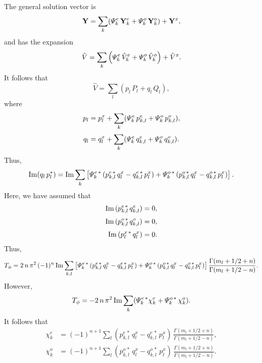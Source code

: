 \documentclass[12pt,prb,aps,notitlepage]{revtex4-1}
\begin{document}
The
general solution vector
is
\begin{equation}
{\bf Y} = \sum_k ({\mit\Psi}_k^e\,{\bf Y}_k^e + {\mit\Psi}_k^o\,{\bf Y}_k^o) + {\bf Y}^x,
\end{equation}
and has the expansion
\begin{equation}
\hat{V} = \sum_k\left({\mit\Psi}_k^e\,\hat{V}_k^e + {\mit\Psi}_k^o\,\hat{V}_k^o\right) + \hat{V}^x.
\end{equation}
It follows that
\begin{equation}
\hat{V} = \sum_l (p_l\,P_l+q_l\,Q_l),
\end{equation}
where 
\begin{align}
p_l &= p_l^x + \sum_k({\mit\Psi}_k^e\,p_{k,l}^e+ {\mit\Psi}_k^o\,p_{k,l}^o),\\[0.5ex]
q_l&= q_l^x + \sum_k({\mit\Psi}_k^e\,q_{k,l}^e+ {\mit\Psi}_k^o\,q_{k,l}^o).
\end{align}
Thus, 
\begin{equation}
{\rm Im}(q_l\,p_l^\ast)={\rm Im}\sum_k\left[{\mit\Psi}_k^{e\,\ast}\,(p_{k,l}^{e\,\ast}\,q_l^x - q_{k,l}^{e\,\ast}\,p_l^x) + {\mit\Psi}_k^{o\,\ast}\,(p_{k,l}^{o\,\ast}\,q_l^x-q_{k,l}^{o\,\ast}\,p_l^x)\right].
\end{equation}
Here, we have assumed that
\begin{align}
{\rm Im}\,(p_{k,l}^{e\,\ast}\,q_{k,l}^e)&=0,\\[0.5ex]
{\rm Im}\,( p_{k,l}^{o\,\ast}\,q_{k,l}^o)&=0,\\[0.5ex]
{\rm Im}\,(p_l^{x\,\ast}\,q_l^x)&=0.
\end{align}
Thus, 
\begin{equation}
T_\phi = 2\,n\,\pi^2\,(-1)^n\,{\rm Im}\sum_{k,l}\left[{\mit\Psi}_k^{e\,\ast}\,(p_{k,l}^{e\,\ast}\,q_l^x - q_{k,l}^{e\,\ast}\,p_l^x) + {\mit\Psi}_k^{o\,\ast}\,(p_{k,l}^{o\,\ast}\,q_l^x-q_{k,l}^{o\,\ast}\,p_l^x)\right]\frac{\Gamma(m_l+1/2+n)}{\Gamma(m_l+1/2-n)}.
\end{equation}
However,
\begin{equation}
T_\phi = - 2\,n\,\pi^2\,{\rm Im}\sum_k({\mit\Psi}_k^{e\,\ast}\chi_k^e + {\mit\Psi}_k^{o\,\ast}\,\chi_k^o).
\end{equation}
It follows that
\begin{align}
\chi_k^e &= (-1)^{n+1}\sum_l (p_{k,l}^{e\,\ast}\,q_l^x- q_{k,l}^{e\,\ast}\,p_l^x) \,\frac{\Gamma(m_l+1/2+n)}{\Gamma(m_l+1/2-n)},\\[0.5ex]
\chi_k^o &= (-1)^{n+1}\sum_l (p_{k,l}^{o\,\ast}\,q_l^x-q_{k,l}^{o\,\ast}\,p_l^x)\,\frac{\Gamma(m_l+1/2+n)}{\Gamma(m_l+1/2-n)}.
\end{align}
\end{document}
